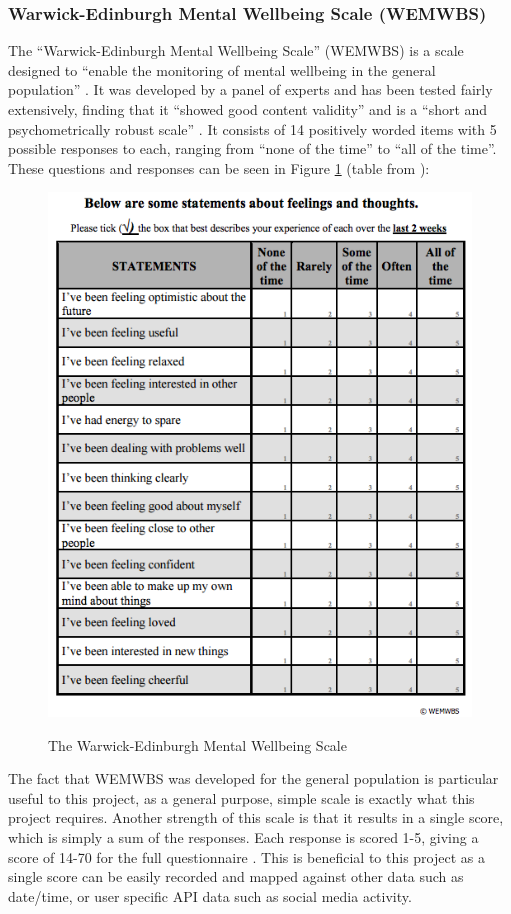 \documentclass[11pt,openright,a4paper]{report}
\begin{document}
\subsubsection{Warwick-Edinburgh Mental Wellbeing Scale (WEMWBS)}
The \enquote{Warwick-Edinburgh Mental Wellbeing Scale} (WEMWBS) is a scale designed to \enquote{enable the monitoring of mental wellbeing in the general population} \parencite{wemwbs}. It was developed by a panel of experts \parencite{wemwbsdevelopment} and has been tested fairly extensively, finding that it \enquote{showed good content validity} and is a \enquote{short and psychometrically robust scale} \parencite{tennant2007warwick}. It consists of 14 positively worded items with 5 possible responses to each, ranging from \enquote{none of the time} to \enquote{all of the time}.
\newpage
These questions and responses can be seen in Figure \ref{fig:wemwbs} (table from \parencite{wemwbsquestions}):
\begin{figure}[ht]
\centering
\caption{The Warwick-Edinburgh Mental Wellbeing Scale}
\includegraphics[width=.8\textwidth]{i/wemwbs.png}
\label{fig:wemwbs}
\end{figure}

The fact that WEMWBS was developed for the general population is particular useful to this project, as a general purpose, simple scale is exactly what this project requires. Another strength of this scale is that it results in a single score, which is simply a sum of the responses. Each response is scored 1-5, giving a score of 14-70 for the full questionnaire \parencite{wemwbsscoring}. This is beneficial to this project as a single score can be easily recorded and mapped against other data such as date/time, or user specific API data such as social media activity.
\end{document}
